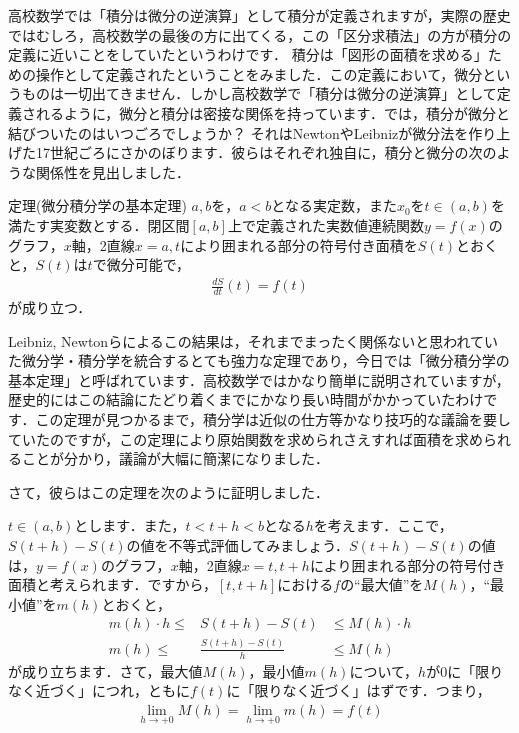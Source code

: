 \par 高校数学では「積分は微分の逆演算」として積分が定義されますが，実際の歴史ではむしろ，高校数学の最後の方に出てくる，この「区分求積法」の方が積分の定義に近いことをしていたというわけです．
積分は「図形の面積を求める」ための操作として定義されたということをみました．この定義において，微分というものは一切出てきません．しかし高校数学で「積分は微分の逆演算」として定義されるように，微分と積分は密接な関係を持っています．では，積分が微分と結びついたのはいつごろでしょうか？ それはNewtonやLeibnizが微分法を作り上げた17世紀ごろにさかのぼります．彼らはそれぞれ独自に，積分と微分の次のような関係性を見出しました． 
\begin{itembox}[l]{定理(微分積分学の基本定理)}
$a,b$を，$a<b$となる実定数，また$x_0$を$t\in (a,b)$を満たす実変数とする．閉区間$[a,b]$上で定義された実数値連続関数$y=f(x)$のグラフ，$x$軸，2直線$x=a,t$により囲まれる部分の符号付き面積を$S(t)$とおくと，$S(t)$は$t$で微分可能で，
\begin{eqnarray}
\frac{dS}{dt}(t)=f(t) \nonumber
\end{eqnarray}
が成り立つ．
\end{itembox}
\par Leibniz, Newtonらによるこの結果は，それまでまったく関係ないと思われていた微分学・積分学を統合するとても強力な定理であり，今日では「微分積分学の基本定理」と呼ばれています．高校数学ではかなり簡単に説明されていますが，歴史的にはこの結論にたどり着くまでにかなり長い時間がかかっていたわけです．この定理が見つかるまで，積分学は近似の仕方等かなり技巧的な議論を要していたのですが，この定理により原始関数を求められさえすれば面積を求められることが分かり，議論が大幅に簡潔になりました．
\par さて，彼らはこの定理を次のように証明しました．
\par $t\in(a,b)$とします．また，$t<t+h<b$となる$h$を考えます．ここで，$S(t+h)-S(t)$の値を不等式評価してみましょう．$S(t+h)-S(t)$の値は，$y=f(x)$のグラフ，$x$軸，2直線$x=t,t+h$により囲まれる部分の符号付き面積と考えられます．ですから，$[t,t+h]$における$f$の“最大値”を$M(h)$，“最小値”を$m(h)$とおくと，
\begin{eqnarray}
m(h) \cdot h \le & S(t+h)-S(t) & \le M(h) \cdot h \nonumber \\
m(h) \le & \frac{S(t+h)-S(t)}{h} & \le M(h) \nonumber
\end{eqnarray}
が成り立ちます．さて，最大値$M(h)$，最小値$m(h)$について，$h$が0に「限りなく近づく」につれ，ともに$f(t)$に「限りなく近づく」はずです．つまり，
\begin{eqnarray}
\lim_{h \to +0}M(h)=\lim_{h \to +0}m(h)=f(t) \nonumber
\end{eqnarray}
